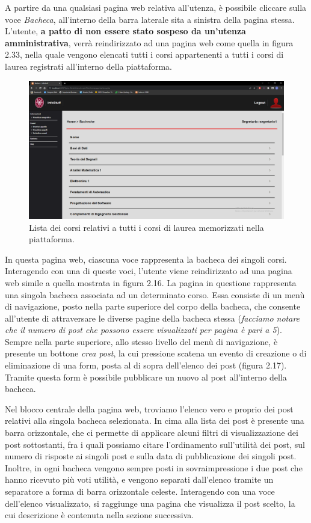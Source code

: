 \documentclass [a4paper,11pt]{book}
\begin{document}
A partire da una qualsiasi pagina web relativa all'utenza, è possibile cliccare sulla voce \emph{Bacheca}, all'interno della barra laterale sita a sinistra della pagina stessa. L'utente, \textbf{a patto di non essere stato sospeso da un'utenza amministrativa}, verrà reindirizzato ad una pagina web come quella in figura 2.33, nella quale vengono elencati tutti i corsi appartenenti a tutti i corsi di laurea registrati all'interno della piattaforma.

\begin{figure}
\centering
\includegraphics[scale=0.3]{figura2-33.png}
\caption{Lista dei corsi relativi a tutti i corsi di laurea memorizzati nella piattaforma.}
\end{figure}

In questa pagina web, ciascuna voce rappresenta la bacheca dei singoli corsi. Interagendo con una di queste voci, l'utente viene reindirizzato ad una pagina web simile a quella mostrata in figura 2.16. La pagina in questione rappresenta una singola bacheca associata ad un determinato corso. Essa consiste di un menù di navigazione, posto nella parte superiore del corpo della bacheca, che consente all'utente di attraversare le diverse pagine della bacheca stessa (\emph{facciamo notare che il numero di post che possono essere visualizzati per pagina è pari a 5}). Sempre nella parte superiore, allo stesso livello del menù di navigazione, è presente un bottone \emph{crea post}, la cui pressione scatena un evento di creazione o di eliminazione di una form, posta al di sopra dell'elenco dei post (figura 2.17). Tramite questa form è possibile pubblicare un nuovo al post all'interno della bacheca.

Nel blocco centrale della pagina web, troviamo l'elenco vero e proprio dei post relativi alla singola bacheca selezionata. In cima alla lista dei post è presente una barra orizzontale, che ci permette di applicare alcuni filtri di visualizzazione dei post sottostanti, fra i quali possiamo citare l'ordinamento sull'utilità dei post, sul numero di risposte ai singoli post e sulla data di pubblicazione dei singoli post. Inoltre, in ogni bacheca vengono sempre posti in sovraimpressione i due post che hanno ricevuto più voti utilità, e vengono separati dall'elenco tramite un separatore a forma di barra orizzontale celeste. Interagendo con una voce dell'elenco visualizzato, si raggiunge una pagina che visualizza il post scelto, la cui descrizione è contenuta nella sezione successiva.
\end{document}
